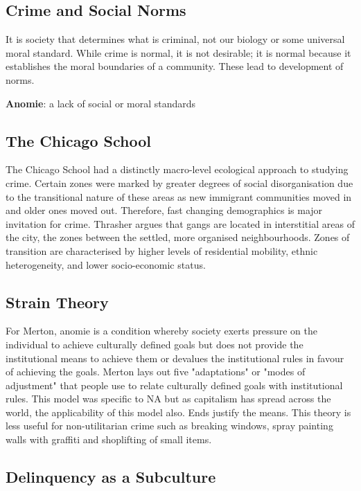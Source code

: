 \documentclass[11pt]{article}
\begin{document}
\subsection{Crime and Social Norms}

It is society that determines what is criminal, not our biology or some universal moral standard. While crime is normal, it is not desirable; it is normal because it establishes the moral boundaries of a community. These lead to development of norms. 

\textbf{Anomie}: a lack of social or moral standards

\subsection{The Chicago School}

The Chicago School had a distinctly macro-level ecological approach to studying crime. Certain zones were marked by greater degrees of social disorganisation due to the transitional nature of these areas as new immigrant communities moved in and older ones moved out. Therefore, fast changing demographics is major invitation for crime. Thrasher argues that gangs are located in interstitial areas of the city, the zones between the settled, more organised neighbourhoods. Zones of transition are characterised by higher levels of residential mobility, ethnic heterogeneity, and lower socio-economic status.

\subsection{Strain Theory}

For Merton, anomie is a condition whereby society exerts pressure on the individual to achieve culturally defined goals but does not provide the institutional means to achieve them or devalues the institutional rules in favour of achieving the goals. Merton lays out five "adaptations" or "modes of adjustment" that people use to relate culturally defined goals with institutional rules. This model was specific to NA but as capitalism has spread across the world, the applicability of this model also. Ends justify the means. This theory is less useful for non-utilitarian crime such as breaking windows, spray painting walls with graffiti and shoplifting of small items.

\subsection{Delinquency as a Subculture}
\end{document}
